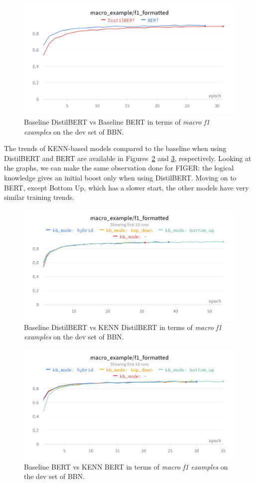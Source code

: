 \begin{figure}[bth]
    \centering
    \includegraphics[width=.8\linewidth]{figures/wandb_bbn_baseline_distilbert_vs_bert.png}
    \caption{Baseline DistilBERT vs Baseline BERT in terms of \textit{macro f1 examples} on the dev set of BBN.}
    \label{fig:wandb_bbn_baseline_distilbert_vs_bert}
\end{figure}

The trends of KENN-based models compared to the baseline when using DistilBERT and BERT are available in Figures~\ref{fig:wandb_bbn_kenn_distilbert} and \ref{fig:wandb_bbn_kenn_bert}, respectively. Looking at the graphs, we can make the same observation done for FIGER: the logical knowledge gives an initial boost only when using DistilBERT. Moving on to BERT, except Bottom Up, which has a slower start, the other models have very similar training trends.

\begin{figure}[bth]
    \centering
    \includegraphics[width=.8\linewidth]{figures/wandb_bbn_kenn_distilbert.png}
    \caption{Baseline DistilBERT vs KENN DistilBERT in terms of \textit{macro f1 examples} on the dev set of BBN.}
    \label{fig:wandb_bbn_kenn_distilbert}
\end{figure}

\begin{figure}[bth]
    \centering
    \includegraphics[width=.8\linewidth]{figures/wandb_bbn_kenn_bert.png}
    \caption{Baseline BERT vs KENN BERT in terms of \textit{macro f1 examples} on the dev set of BBN.}
    \label{fig:wandb_bbn_kenn_bert}
\end{figure}

